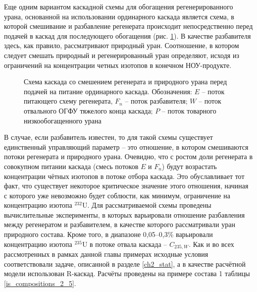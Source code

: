 Еще одним вариантом каскадной схемы для обогащения регенерированного урана, основанной на использовании ординарного каскада является схема, в которой смешивание и разбавление регенерата происходит непосредственно перед подачей в каскад для последующего обогащения (рис. \ref{o3}). В качестве разбавителя здесь, как правило, рассматривают природный уран. Соотношение, в котором следует смешать природный и регенерированный уран определяют, исходя из ограничений на концентрации четных изотопов в конечном НОУ-продукте.

\begin{figure}[ht]
  \caption{Схема каскада со смешением регенерата и природного урана перед подачей на питание ординарного каскада. Обозначения: $E$ -- поток питающего схему регенерата, $F_n$ -- поток разбавителя; $W$ -- поток отвального ОГФУ тяжелого конца каскада; $P$ -- поток товарного низкообогащенного урана}\label{o3}
\end{figure}

В случае, если разбавитель известен, то для такой схемы существует единственный управляющий параметр -- это отношение, в котором смешиваются потоки регенерата и природного урана. Очевидно, что с ростом доли регенерата в совокупном питании каскада (смесь потоков $E$ и $F_n$) будут возрастать концентрации чётных изотопов в потоке отбора каскада. Это обуславливает тот факт, что существует некоторое критическое значение этого отношения, начиная с которого уже невозможно будет соблюсти, как минимум, ограничение на концентрацию изотопа $^{232}$U. Для рассматриваемой схемы проведены вычислительные эксперименты, в которых варьировали отношение разбавления между регенератом и разбавителем, в качестве которого рассматривали уран природного состава. Кроме того, в диапазоне 0,05--0,3\% варьировали концентрацию изотопа $^{235}$U в потоке отвала каскада -- $C_{235, W}$. Как и во всех рассмотренных в рамках данной главы примерах исходные условия соответствовали задаче, описанной в разделе \ref{ch2_stat}, а в качестве расчётной модели использован R-каскад. Расчёты проведены на примере состава 1 таблицы \ref{is_compositions_2_5}. 

